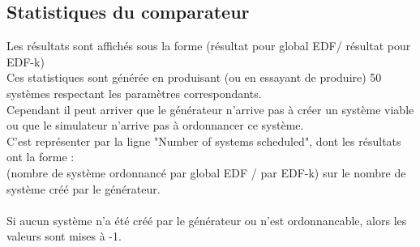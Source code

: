 \documentclass[a4paper,10pt]{article}
\begin{document}
	  
	 \subsection{Statistiques du comparateur}

		Les résultats sont affichés sous la forme (résultat pour global EDF/ résultat pour EDF-k)\\
		Ces statistiques sont générée en produisant (ou en essayant de produire) 50 systèmes respectant les paramètres correspondants.\\
		Cependant il peut arriver que le générateur n'arrive pas à créer un système viable ou que le simulateur n'arrive pas à ordonnancer ce système.\\
		C'est représenter par la ligne "Number of systems scheduled", dont les résultats ont la forme :\\
		(nombre de système ordonnancé par global EDF / par EDF-k) sur le nombre de système créé par le générateur.\\
		~\\
		Si aucun système n'a été créé par le générateur ou n'est ordonnancable, alors les valeurs sont mises à -1.
\end{document}
